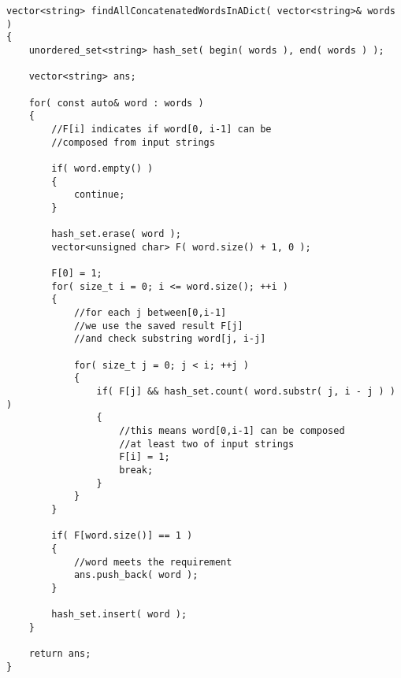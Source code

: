 \begin{lstlisting}[style=customc, caption={}]
vector<string> findAllConcatenatedWordsInADict( vector<string>& words )
{
    unordered_set<string> hash_set( begin( words ), end( words ) );

    vector<string> ans;

    for( const auto& word : words )
    {
        //F[i] indicates if word[0, i-1] can be
        //composed from input strings

        if( word.empty() )
        {
            continue;
        }

        hash_set.erase( word );
        vector<unsigned char> F( word.size() + 1, 0 );

        F[0] = 1;
        for( size_t i = 0; i <= word.size(); ++i )
        {
            //for each j between[0,i-1]
            //we use the saved result F[j]
            //and check substring word[j, i-j]

            for( size_t j = 0; j < i; ++j )
            {
                if( F[j] && hash_set.count( word.substr( j, i - j ) ) )
                {
                    //this means word[0,i-1] can be composed
                    //at least two of input strings
                    F[i] = 1;
                    break;
                }
            }
        }

        if( F[word.size()] == 1 )
        {
            //word meets the requirement
            ans.push_back( word );
        }

        hash_set.insert( word );
    }

    return ans;
}
\end{lstlisting}